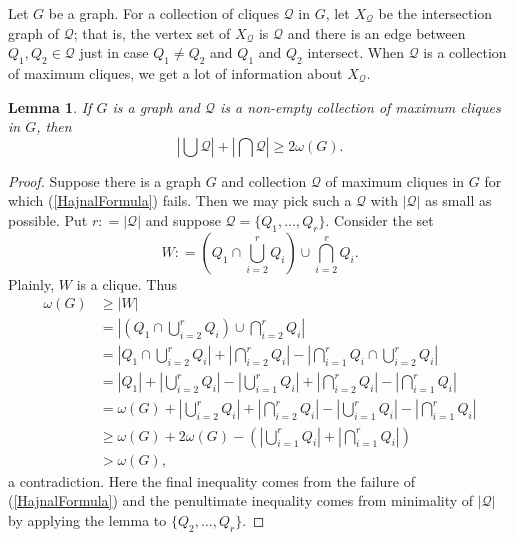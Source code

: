 \documentclass[openany]{tufte-book} %
\theoremstyle{plain}
\newtheorem{lemma}{Lemma}
\newcommand{\card}[1]{\left|#1\right|}
\newcommand{\DefinedAs}{\mathrel{\mathop:}=}
\newcommand{\fancy}[1]{\mathcal{#1}}
\newcommand{\Q}{\fancy{Q}}
\begin{document}
Let $G$ be a graph. For a collection of cliques $\Q$ in $G$, let $X_\Q$ be the intersection graph of $\Q$; that is, the 
vertex set of $X_\Q$ is $\Q$ and there is an edge between $Q_1, Q_2 \in \Q$ just in case $Q_1 \ne Q_2$ and $Q_1$ and $Q_2$ intersect.
When $\Q$ is a collection of maximum cliques, we get a lot of information about $X_\Q$.  
\begin{lemma}\label{HajnalLemma}
If $G$ is a graph and $\Q$ is a non-empty collection of maximum cliques in $G$, then 
\begin{equation}\label{HajnalFormula}
\card{\bigcup \Q} + \card{\bigcap \Q} \geq 2\omega(G).
\end{equation}
\end{lemma}
\begin{proof}
Suppose there is a graph $G$ and collection $\Q$ of maximum cliques in $G$ for which (\ref{HajnalFormula}) fails. Then we may pick such a $\Q$ with $|\mathcal{Q}|$ as small as possible.  
Put $r \DefinedAs |\mathcal{Q}|$ and suppose $\mathcal{Q} = \{Q_1, \ldots, Q_r\}$.  
Consider the set \[W \DefinedAs (Q_1 \cap \bigcup_{i=2}^r Q_i) \cup \bigcap_{i=2}^r Q_i.\]  Plainly, $W$ is a clique.  Thus
\begin{align*}
\omega(G) &\geq |W| \\
&= \card{(Q_1 \cap \bigcup_{i=2}^r Q_i) \cup \bigcap_{i=2}^r Q_i} \\
&= \card{Q_1 \cap \bigcup_{i=2}^r Q_i} + \card{\bigcap_{i=2}^r Q_i} - \card{\bigcap_{i=1}^r Q_i \cap \bigcup_{i=2}^r Q_i} \\
&= \card{Q_1} +\card{\bigcup_{i=2}^r Q_i} - \card{\bigcup_{i=1}^r Q_i} + \card{\bigcap_{i=2}^r Q_i} - \card{\bigcap_{i=1}^r Q_i} \\
&= \omega(G) +\card{\bigcup_{i=2}^r Q_i} + \card{\bigcap_{i=2}^r Q_i} - \card{\bigcup_{i=1}^r Q_i} - \card{\bigcap_{i=1}^r Q_i} \\
&\geq \omega(G) + 2\omega(G) - \left(\card{\bigcup_{i=1}^r Q_i} + \card{\bigcap_{i=1}^r Q_i}\right) \\
& > \omega(G),
\end{align*}
a contradiction.  Here the final inequality comes from the failure of (\ref{HajnalFormula}) and the penultimate inequality comes from minimality of $|\mathcal{Q}|$ by applying the lemma to $\{Q_2, \ldots, Q_r\}$.
\end{proof}
\end{document}
